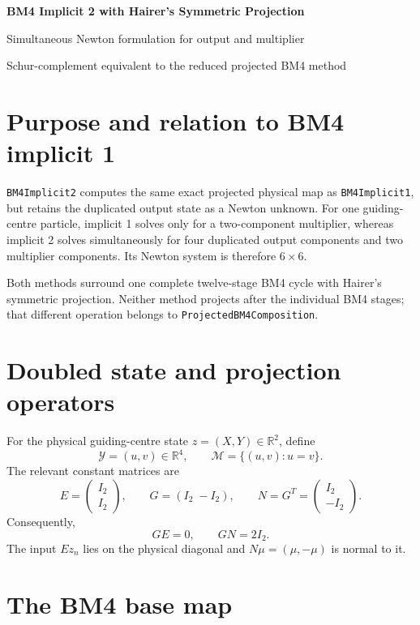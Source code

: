 \documentclass[11pt,a4paper]{article}
\newcommand{\R}{\mathbb{R}}
\newcommand{\Id}{I}
\newcommand{\Y}{\mathcal{Y}}
\newcommand{\M}{\mathcal{M}}
\begin{document}
\begin{center}
  {\LARGE\bfseries\color{blue}BM4 Implicit 2 with Hairer's Symmetric Projection}\par
  \vspace{0.35em}
  {\large Simultaneous Newton formulation for output and multiplier}\par
  \vspace{0.45em}
  {\small Schur-complement equivalent to the reduced projected BM4 method}
\end{center}

\vspace{0.5em}

\section{Purpose and relation to BM4 implicit 1}

\texttt{BM4Implicit2} computes the same exact projected physical map as
\texttt{BM4Implicit1}, but retains the duplicated output state as a Newton
unknown.  For one guiding-centre particle, implicit 1 solves only for a
two-component multiplier, whereas implicit 2 solves simultaneously for four
duplicated output components and two multiplier components.  Its Newton system
is therefore $6\times6$.

Both methods surround one complete twelve-stage BM4 cycle with Hairer's
symmetric projection.  Neither method projects after the individual BM4 stages;
that different operation belongs to \texttt{ProjectedBM4Composition}.

\section{Doubled state and projection operators}

For the physical guiding-centre state $z=(X,Y)\in\R^2$, define
\[
 \Y=(u,v)\in\R^4,
 \qquad
 \M=\{(u,v):u=v\}.
\]
The relevant constant matrices are
\[
 E=\begin{pmatrix}\Id_2\\\Id_2\end{pmatrix},
 \qquad
 G=(\Id_2\;-\Id_2),
 \qquad
 N=G^T=\begin{pmatrix}\Id_2\\-\Id_2\end{pmatrix}.
\]
Consequently,
\[
 GE=0,
 \qquad
 GN=2\Id_2.
\]
The input $Ez_n$ lies on the physical diagonal and $N\mu=(\mu,-\mu)$
is normal to it.

\section{The BM4 base map}
\end{document}
